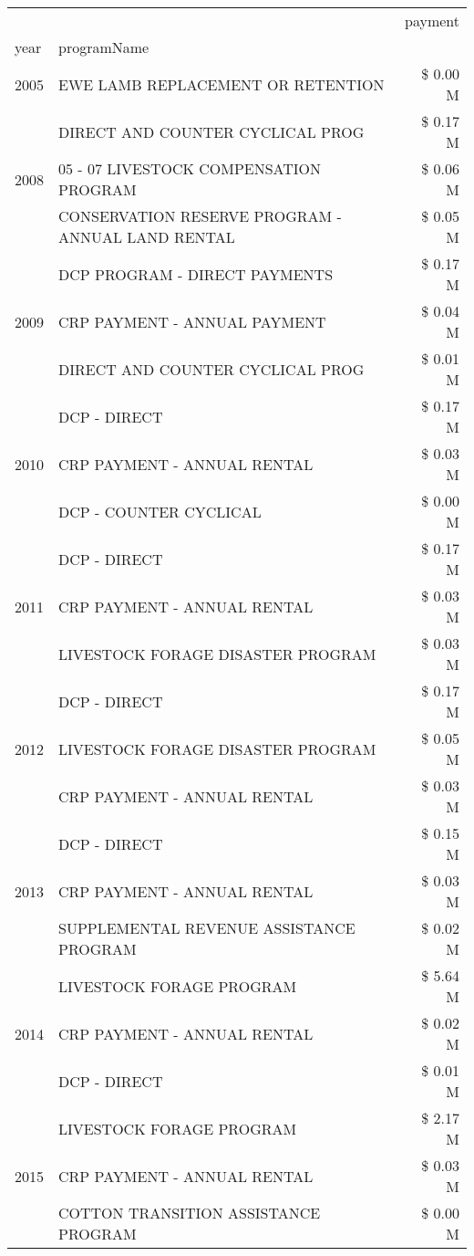 \begin{tabular}{llr}
\toprule
 &  & payment \\
year & programName &  \\
\midrule
2005 & EWE LAMB REPLACEMENT OR RETENTION & \$ 0.00 M \\
\cline{1-3}
\multirow[t]{3}{*}{2008} & DIRECT AND COUNTER CYCLICAL PROG & \$ 0.17 M \\
 & 05 - 07 LIVESTOCK COMPENSATION PROGRAM & \$ 0.06 M \\
 & CONSERVATION RESERVE PROGRAM - ANNUAL LAND RENTAL & \$ 0.05 M \\
\cline{1-3}
\multirow[t]{3}{*}{2009} & DCP PROGRAM - DIRECT PAYMENTS & \$ 0.17 M \\
 & CRP PAYMENT - ANNUAL PAYMENT & \$ 0.04 M \\
 & DIRECT AND COUNTER CYCLICAL PROG & \$ 0.01 M \\
\cline{1-3}
\multirow[t]{3}{*}{2010} & DCP - DIRECT & \$ 0.17 M \\
 & CRP PAYMENT - ANNUAL RENTAL & \$ 0.03 M \\
 & DCP - COUNTER CYCLICAL & \$ 0.00 M \\
\cline{1-3}
\multirow[t]{3}{*}{2011} & DCP - DIRECT & \$ 0.17 M \\
 & CRP PAYMENT - ANNUAL RENTAL & \$ 0.03 M \\
 & LIVESTOCK FORAGE DISASTER PROGRAM & \$ 0.03 M \\
\cline{1-3}
\multirow[t]{3}{*}{2012} & DCP - DIRECT & \$ 0.17 M \\
 & LIVESTOCK FORAGE DISASTER PROGRAM & \$ 0.05 M \\
 & CRP PAYMENT - ANNUAL RENTAL & \$ 0.03 M \\
\cline{1-3}
\multirow[t]{3}{*}{2013} & DCP - DIRECT & \$ 0.15 M \\
 & CRP PAYMENT - ANNUAL RENTAL & \$ 0.03 M \\
 & SUPPLEMENTAL REVENUE ASSISTANCE PROGRAM & \$ 0.02 M \\
\cline{1-3}
\multirow[t]{3}{*}{2014} & LIVESTOCK FORAGE PROGRAM & \$ 5.64 M \\
 & CRP PAYMENT - ANNUAL RENTAL & \$ 0.02 M \\
 & DCP - DIRECT & \$ 0.01 M \\
\cline{1-3}
\multirow[t]{3}{*}{2015} & LIVESTOCK FORAGE PROGRAM & \$ 2.17 M \\
 & CRP PAYMENT - ANNUAL RENTAL & \$ 0.03 M \\
 & COTTON TRANSITION ASSISTANCE PROGRAM & \$ 0.00 M \\

\end{tabular}
